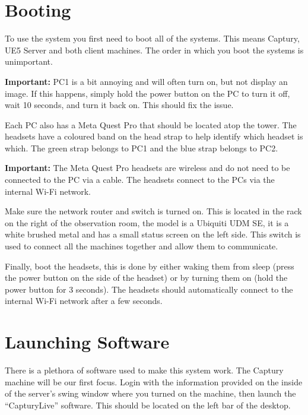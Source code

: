 \section{Booting}
To use the system you first need to boot all of the systems. This means Captury, UE5 Server and both client machines. The order in which you boot the systems is unimportant.

\begin{tcolorbox}
    \textbf{Important:} PC1 is a bit annoying and will often turn on, but not display an image. If this happens, simply hold the power button on the PC to turn it off, wait 10 seconds, and turn it back on. This should fix the issue.
\end{tcolorbox}

Each PC also has a Meta Quest Pro that should be located atop the tower. The headsets have a coloured band on the head strap to help identify which headset is which. The green strap belongs to PC1 and the blue strap belongs to PC2.

\begin{tcolorbox}
    \textbf{Important:} The Meta Quest Pro headsets are wireless and do not need to be connected to the PC via a cable. The headsets connect to the PCs via the internal Wi-Fi network.
\end{tcolorbox}

Make sure the network router and switch is turned on. This is located in the rack on the right of the observation room, the model is a Ubiquiti UDM SE, it is a white brushed metal and has a small status screen on the left side. This switch is used to connect all the machines together and allow them to communicate.

Finally, boot the headsets, this is done by either waking them from sleep (press the power button on the side of the headset) or by turning them on (hold the power button for 3 seconds). The headsets should automatically connect to the internal Wi-Fi network after a few seconds.

\section{Launching Software}
There is a plethora of software used to make this system work. The Captury machine will be our first focus. Login with the information provided on the inside of the server's swing window where you turned on the machine, then launch the ``CapturyLive'' software. This should be located on the left bar of the desktop.

